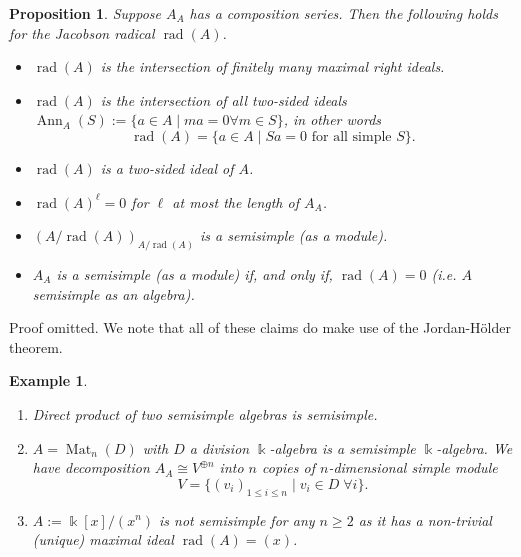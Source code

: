 \documentclass[11pt,a4paper]{article}
\numberwithin{equation}{section}
\theoremstyle{all}
\newtheorem{proposition}[theorem]{Proposition}
\newtheorem{example}[theorem]{Example}
\newtheorem*{exercise*}{Exercise}
\theoremstyle{remark}
\newcommand{\rad}{\operatorname{rad}\nolimits}
\newcommand{\Mat}{\operatorname{Mat}\nolimits}
\newcommand{\Ann}{\operatorname{Ann}\nolimits}
\newcommand{\defn}[1]{\textsl{\color{darkblue} #1}}
\begin{document}
\begin{proposition}\label{prop:radical}
Suppose $A_A$ has a composition series.
Then the following holds for the Jacobson radical $\rad(A)$.
\begin{itemize}
\item $\rad(A)$ is the intersection of finitely many maximal right ideals.
\item $\rad(A)$ is the intersection of all two-sided ideals $\Ann_A(S):=\{a\in A\mid ma=0\forall m\in S\}$, in other words
\[\rad(A)=\{a\in A\mid Sa=0\text{ for all simple }S\}.\]
\item $\rad(A)$ is a two-sided ideal of $A$.
\item $\rad(A)^\ell=0$ for $\ell$ at most the length of $A_A$. 
\item $(A/\rad(A))_{A/\rad(A)}$ is a semisimple (as a module).
\item $A_A$ is a semisimple (as a module) if, and only if, $\rad(A)=0$ (i.e. $A$ semisimple as an algebra).
\end{itemize} 
\end{proposition}

Proof omitted.  We note that all of these claims do make use of the Jordan-H\"{o}lder theorem.


\begin{example}
\begin{enumerate}
\item Direct product of two semisimple algebras is semisimple.

\item $A=\Mat_n(D)$ with $D$ a division $\Bbbk$-algebra is a semisimple $\Bbbk$-algebra.  We have decomposition $A_A\cong V^{\oplus n}$ into $n$ copies of $n$-dimensional simple module \[
V=\{(v_i)_{1\leq i\leq n}\mid v_i\in D\;\forall i\}.\]


\item $A:=\Bbbk[x]/(x^n)$ is not semisimple for any $n\geq 2$ as it has a non-trivial (unique) maximal ideal $\rad(A)=(x)$.

\end{enumerate}
\end{example}


\end{document}
